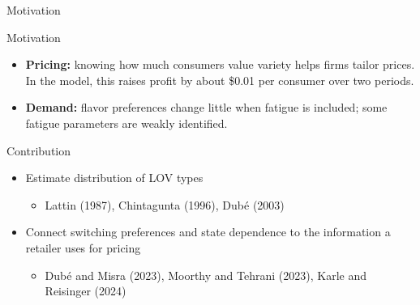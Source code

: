\documentclass[aspectratio=169,11pt]{beamer}
\begin{document}
\begin{frame}{Motivation}
\begin{block}{Motivation}
\begin{itemize}
\item \textbf{Pricing:} knowing how much consumers value variety helps firms tailor prices. In the model, this raises profit by about \$0.01 per consumer over two periods.
\item \textbf{Demand:} flavor preferences change little when fatigue is included; some fatigue parameters are weakly identified.
\end{itemize}
\end{block}
\begin{block}{Contribution}
\begin{itemize}
  \item Estimate distribution of LOV types 
  \begin{itemize}
    \item Lattin (1987), Chintagunta (1996), Dub\'e (2003)
  \end{itemize}
  \item Connect switching preferences and state dependence to the information a retailer uses for pricing
  \begin{itemize}
    \item Dub\'e and Misra (2023), Moorthy and Tehrani (2023), Karle and Reisinger (2024)
  \end{itemize}
\end{itemize}
\end{block}
\end{frame}
\end{document}
